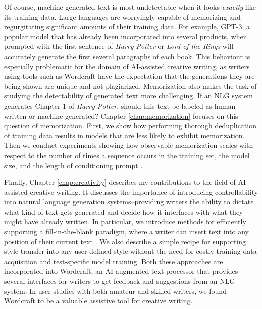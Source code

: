 Of course, machine-generated text is most undetectable when it looks \textit{exactly} like its training data.
Large languages are worryingly capable of memorizing and regurgitating significant amounts of their training data.
For example, GPT-3, a popular model that has already been incorporated into several products, when prompted with the first sentence of \textit{Harry Potter} or \textit{Lord of the Rings} will accurately generate the first several paragraphs of each book.
This behaviour is especially problematic for the domain of AI-assisted creative writing, as writers using tools such as Wordcraft have the expectation that the generations they are being shown are unique and not plagiarized.
Memorization also makes the task of studying the detectability of generated text more challenging.
If an NLG system generates Chapter 1 of \textit{Harry Potter}, should this text be labeled as human-written or machine-generated?
Chapter \ref{chap:memorization} focuses on this question of memorization.
First, we show how performing thorough deduplication of training data results in models that are less likely to exhibit memorization.
Then we conduct experiments showing how observable memorization scales with respect to the number of times a sequence occurs in the training set, the model size, and the length of conditioning prompt \citep{carlini2022quantifying}.

Finally, Chapter \ref{chap:creativity} describes my contributions to the field of AI-assisted creative writing. 
It discusses the importance of introducing controllability into natural language generation systems--providing writers the ability to dictate what kind of text gets generated and decide how it interfaces with what they might have already written.
In particular, we introduce methods for efficiently supporting a fill-in-the-blank paradigm, where a writer can insert text into any position of their current text \citep{fitb_fite}.
We also describe a simple recipe for supporting style-transfer into any user-defined style without the need for costly training data acquisition and test-specific model training.
Both these approaches are incorporated into Wordcraft, an AI-augmented text processor that provides several interfaces for writers to get feedback and suggestions from an NLG system.
In user studies with both amateur and skilled writers, we found Wordcraft to be a valuable assistive tool for creative writing.





